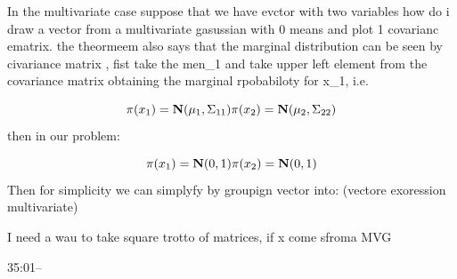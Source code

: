 \documentclass[
  12pt,
  a4paper,
  oneside]{book}
\theoremstyle{definition}
\theoremstyle{definition}
\theoremstyle{definition}
\theoremstyle{remark}
\begin{document}
In the multivariate case suppose that we have evctor with two variables how do i draw a vector from a multivariate gasussian with 0 means and plot 1 covarianc ematrix. the theormeem also says that the marginal distribution can be seen by civariance matrix , fist take the men\_1 and take upper left element from the covariance matrix obtaining the marginal rpobabiloty for x\_1, i.e.

\[
\pi(x_1) = \mathbf{N}(\mu_1, \Sigma_{11}) \\
\pi(x_2) = \mathbf{N}(\mu_2, \Sigma_{22}) 
\]
then in our problem:

\[
\pi(x_1) = \mathbf{N}(0, 1) \\
\pi(x_2) = \mathbf{N}(0, 1) 
\]
Then for simplicity we can simplyfy by groupign vector into:
(vectore exoression multivariate)

I need a wau to take square trotto of matrices, if x come sfroma MVG

35:01--

  
\end{document}
